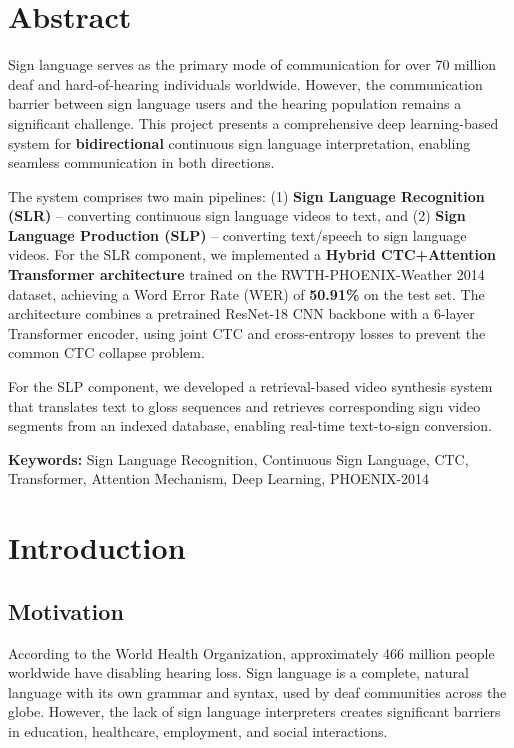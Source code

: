 \documentclass[12pt,a4paper]{article}
\begin{document}
\newpage


\section{Abstract}

Sign language serves as the primary mode of communication for over 70 million deaf and hard-of-hearing individuals worldwide. However, the communication barrier between sign language users and the hearing population remains a significant challenge. This project presents a comprehensive deep learning-based system for \textbf{bidirectional} continuous sign language interpretation, enabling seamless communication in both directions.

The system comprises two main pipelines: (1) \textbf{Sign Language Recognition (SLR)} -- converting continuous sign language videos to text, and (2) \textbf{Sign Language Production (SLP)} -- converting text/speech to sign language videos. For the SLR component, we implemented a \textbf{Hybrid CTC+Attention Transformer architecture} trained on the RWTH-PHOENIX-Weather 2014 dataset, achieving a Word Error Rate (WER) of \textbf{50.91\%} on the test set. The architecture combines a pretrained ResNet-18 CNN backbone with a 6-layer Transformer encoder, using joint CTC and cross-entropy losses to prevent the common CTC collapse problem.

For the SLP component, we developed a retrieval-based video synthesis system that translates text to gloss sequences and retrieves corresponding sign video segments from an indexed database, enabling real-time text-to-sign conversion.

\textbf{Keywords:} Sign Language Recognition, Continuous Sign Language, CTC, Transformer, Attention Mechanism, Deep Learning, PHOENIX-2014

\section{Introduction}

\subsection{Motivation}

According to the World Health Organization, approximately 466 million people worldwide have disabling hearing loss. Sign language is a complete, natural language with its own grammar and syntax, used by deaf communities across the globe. However, the lack of sign language interpreters creates significant barriers in education, healthcare, employment, and social interactions.
\end{document}
